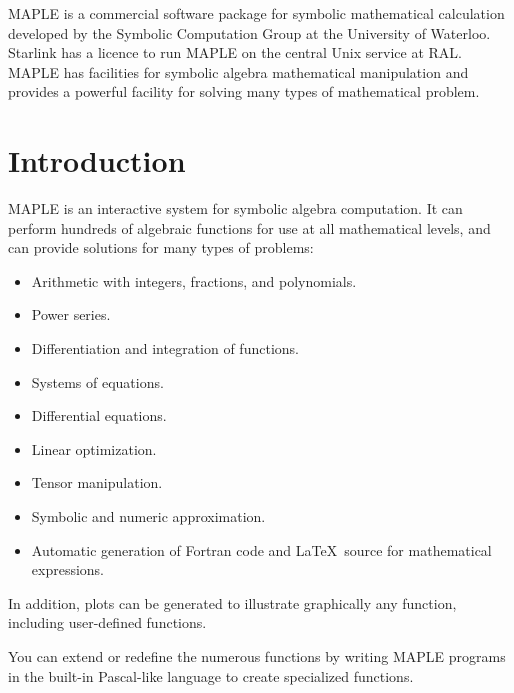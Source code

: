 \documentclass[twoside,11pt]{article}
\newcommand{\stardocinitials}  {SUN}
\newcommand{\stardocnumber}    {107.4}
\newcommand{\stardocabstract}  {%

MAPLE is a commercial software package for symbolic mathematical
calculation developed by the Symbolic Computation Group at the
University of Waterloo.  Starlink has a licence to run MAPLE on the
central Unix service at RAL. MAPLE has facilities for symbolic algebra
mathematical manipulation and provides a powerful facility for solving
many types of mathematical problem.

}
\newcommand{\stardocname}{\stardocinitials /\stardocnumber}
\newenvironment{latexonly}{}{}
\newcommand{\xlabel}[1]{}
\renewcommand{\thepage}{\roman{page}}
\begin{document}
\stardocabstract
\newpage
\begin{latexonly}
    \setlength{\parskip}{0mm}
   \tableofcontents
    \setlength{\parskip}{\medskipamount}
    \markboth{\stardocname}{\stardocname}
\end{latexonly}
\cleardoublepage
\renewcommand{\thepage}{\arabic{page}}
\setcounter{page}{1}


\section{Introduction\xlabel{introduction}}

MAPLE is an interactive system for symbolic algebra computation. It can
perform hundreds of algebraic functions for use at all mathematical
levels, and can provide solutions for many types of problems:

\begin{itemize}
\item Arithmetic with integers, fractions, and polynomials.
\item Power series.
\item Differentiation and integration of functions.
\item Systems of equations.
\item Differential equations.
\item Linear optimization.
\item Tensor manipulation.
\item Symbolic and numeric approximation.
\item Automatic generation of Fortran code and \LaTeX\ source for mathematical
expressions.
\end{itemize}

In addition, plots can be generated to illustrate graphically any
function, including user-defined functions.

You can extend or redefine the numerous functions by writing MAPLE
programs in the built-in Pascal-like language to create specialized
functions.
\end{document}
